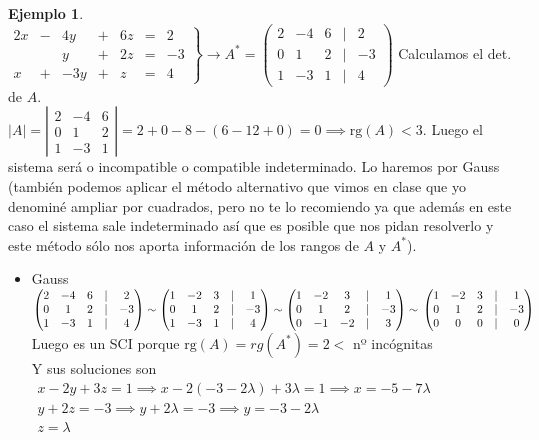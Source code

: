 \documentclass[11pt, oneside]{book}
\theoremstyle{definition} %
\newtheorem{ejem}{Ejemplo}
\newcommand{\deter}[1]{\left| \begin{matrix} #1	\end{matrix}\right|}
\newcommand{\triple}[3]{ \left. \begin{array}{ll}	#1 \\#2 \\#3\\	\end{array} 	\right. }
\newcommand{\rg}{\mathrm{rg}}
\begin{document}
\begin{ejem}\ \\
$\left. \begin{matrix} 2x & - & 4y & + & 6z & = &2\\
 &  & y & + & 2z & = &-3\\
x & + & -3y & + & z & = &4 \end{matrix}\right\}\longrightarrow A^*= \begin{pmatrix} 2&-4&6&|&2\\0&1&2&|&-3\\1&-3&1&|&4\end{pmatrix}$ Calculamos el det. de $A$.\\
$|A|=\deter{2&-4&6\\0&1&2\\1&-3&1}=2+0-8-(6-12+0)= 0\implies \rg(A)<3$. Luego el sistema será o incompatible o compatible indeterminado. Lo haremos por Gauss (también podemos aplicar el método alternativo que vimos en clase que yo denominé ampliar por cuadrados, pero no te lo recomiendo ya que además en este caso el sistema sale indeterminado así que es posible que nos pidan resolverlo y este método sólo nos aporta información de los rangos de $A$ y $A^*$).
\begin{itemize}
	\item Gauss\\
	$\begin{pmatrix} 2&-4&6&|&2\\0&1&2&|&-3\\1&-3&1&|&4 \end{pmatrix}\sim\begin{pmatrix} 1&-2&3&|&1\\0&1&2&|&-3\\1&-3&1&|&4 \end{pmatrix}\sim\begin{pmatrix} 1&-2&3&|&1\\0&1&2&|&-3\\0&-1&-2&|&3\end{pmatrix}\sim\\
	\begin{pmatrix} 1&-2&3&|&1\\0&1&2&|&-3\\0&0&0&|&0 \end{pmatrix}$ Luego es un SCI porque $\rg(A)=rg(A^*)=2<$ nº incógnitas\\
	Y sus soluciones son $\triple{x-2y+3z=1\implies x-2(-3-2\lambda)+3\lambda=1\implies x=-5-7\lambda}{y+2z=-3\implies y+2\lambda=-3\implies y=-3-2\lambda}{z=\lambda}$
\end{itemize}
\end{ejem}
\newpage
\end{document}
